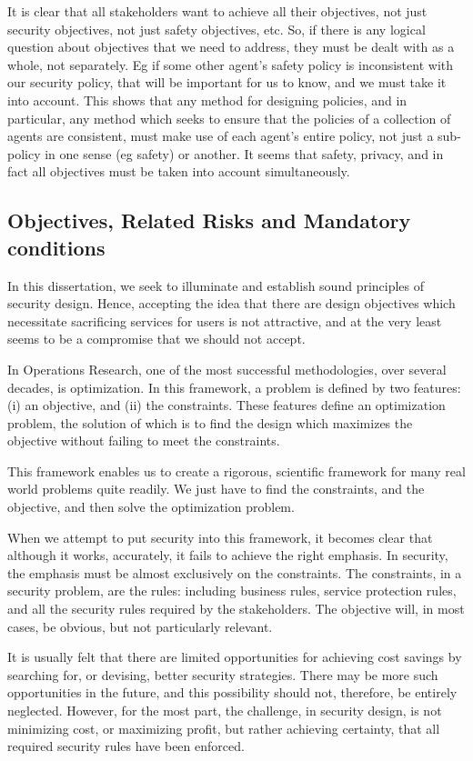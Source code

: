 It is clear that all stakeholders want to achieve all their objectives,
not just security objectives, not just safety objectives, etc. So, if
there is any logical question about objectives that we need to address,
they must be dealt with as a whole, not separately. Eg if some other
agent's safety policy is inconsistent with our security policy, that will
be important for us to know, and we must take it into account. This
shows that any method for designing policies, and in particular,
any method which seeks to ensure that the policies of a collection of
agents are consistent, must make use of each agent's entire policy,
not just a sub-policy in one sense (eg safety) or another. It seems
that safety, privacy, and in fact all objectives must be taken into
account simultaneously.

\subsection{Objectives, Related Risks and Mandatory conditions}
In this dissertation,  we seek to illuminate and establish sound principles of security design. Hence, accepting the idea that there are design objectives which necessitate sacrificing services for users is not attractive, and at the very least seems to be a compromise that we should not accept.


In Operations Research, one of the most successful methodologies, over several decades, is optimization. In this framework, a problem is defined by two features: (i) an objective, and (ii) the constraints. These features define an optimization problem, the solution of which is to find the design which maximizes the objective without failing to meet the constraints.

This framework enables us to create a rigorous, scientific framework for many real world problems quite readily. We just have to find the constraints, and the objective, and then solve the optimization problem.


When we attempt to put security into this framework, it becomes clear that although it works, accurately, it fails to achieve the right emphasis. In security, the emphasis must be almost exclusively on the constraints. The constraints, in a security problem, are the rules: including business rules, service protection rules, and all the security rules required by the stakeholders. The objective will, in most cases, be obvious, but not particularly relevant.

It is usually felt that there are limited opportunities for achieving cost savings by searching for, or devising, better security strategies. There may be more such opportunities in the future, and this possibility should not, therefore, be entirely neglected. However, for the most part, the challenge, in security design, is not minimizing cost, or maximizing profit, but rather achieving certainty, that all required security rules have been enforced.


